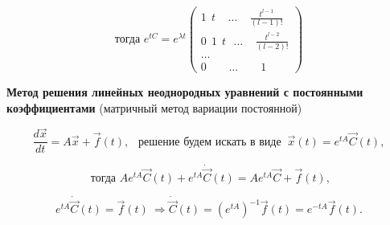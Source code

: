 \begin{equation*}
    \text{тогда } e^{tC} = e^{\lambda t}
     \begin{pmatrix}
        1\ \ t\ \ \ \ \  \dots\ \ \ \ \ \frac{t^{l-1}}{(l-1)!} \\
        0\ \ 1\ \ t\ \ \ \dots\ \ \ \ \ \frac{t^{l-2}}{(l-2)!} \\
        \dots \\
        0\ \ \ \ \ \ \ \ \ \dots\ \ \ \ \ \ \ \ \ 1
    \end{pmatrix}
\end{equation*}

\textbf{Метод решения линейных неоднородных уравнений с постоянными коэффициентами} (матричный метод вариации постоянной)

\[ \frac{d\overrightarrow{x}}{dt} = A\overrightarrow{x} + \overrightarrow{f}(t),\ \ \text{ решение будем искать в виде } \ \overrightarrow{x}(t) = e^{tA}\overrightarrow{C}(t), \]

\[ \text{ тогда } Ae^{tA}\overrightarrow{C}(t) + e^{tA}\dot{\overrightarrow{C}}(t) = Ae^{tA}\overrightarrow{C} + \overrightarrow{f}(t),\]

\[ e^{tA}\dot{\overrightarrow{C}}(t) = \overrightarrow{f}(t)\ \Rightarrow \dot{\overrightarrow{C}}(t) = (e^{tA})^{-1}\overrightarrow{f}(t) = e^{-tA}\overrightarrow{f}(t). \]

\newpage
